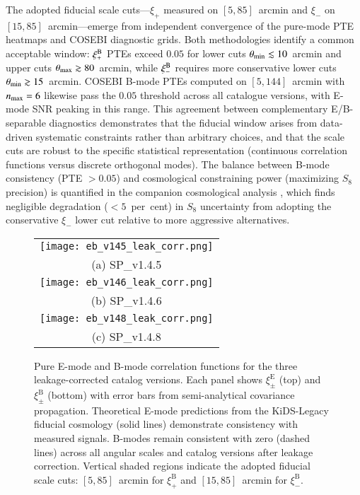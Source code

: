 \documentclass{aa}
\begin{document}
The adopted fiducial scale cuts—$\xi_+$ measured on $[5, 85]$~arcmin and $\xi_-$ on $[15, 85]$~arcmin—emerge from independent convergence of the pure-mode PTE heatmaps and COSEBI diagnostic grids. Both methodologies identify a common acceptable window: $\xi_+^{\rm B}$ PTEs exceed $0.05$ for lower cuts $\theta_{\rm min} \lesssim 10$~arcmin and upper cuts $\theta_{\rm max} \gtrsim 80$~arcmin, while $\xi_-^{\rm B}$ requires more conservative lower cuts $\theta_{\rm min} \gtrsim 15$~arcmin. COSEBI B-mode PTEs computed on $[5, 144]$~arcmin with $n_{\rm max} = 6$ likewise pass the $0.05$ threshold across all catalogue versions, with E-mode SNR peaking in this range. This agreement between complementary E/B-separable diagnostics demonstrates that the fiducial window arises from data-driven systematic constraints rather than arbitrary choices, and that the scale cuts are robust to the specific statistical representation (continuous correlation functions versus discrete orthogonal modes). The balance between B-mode consistency (PTE $> 0.05$) and cosmological constraining power (maximizing $S_8$ precision) is quantified in the companion cosmological analysis \citep{goh.etal25}, which finds negligible degradation ($< 5$~per~cent) in $S_8$ uncertainty from adopting the conservative $\xi_-$ lower cut relative to more aggressive alternatives.

\begin{figure*}[p]
\centering
\begin{tabular}{c}
\texttt{[image: eb\_v145\_leak\_corr.png]} \\
(a) SP\_v1.4.5 \\[6pt]
\texttt{[image: eb\_v146\_leak\_corr.png]} \\
(b) SP\_v1.4.6 \\[6pt]
\texttt{[image: eb\_v148\_leak\_corr.png]} \\
(c) SP\_v1.4.8
\end{tabular}
\caption{Pure E-mode and B-mode correlation functions for the three leakage-corrected catalog versions. Each panel shows $\xi_\pm^{\mathrm{E}}$ (top) and $\xi_\pm^{\mathrm{B}}$ (bottom) with error bars from semi-analytical covariance propagation. Theoretical E-mode predictions from the KiDS-Legacy fiducial cosmology (solid lines) demonstrate consistency with measured signals. B-modes remain consistent with zero (dashed lines) across all angular scales and catalog versions after leakage correction. Vertical shaded regions indicate the adopted fiducial scale cuts: $[5, 85]$~arcmin for $\xi_+^{\mathrm{B}}$ and $[15, 85]$~arcmin for $\xi_-^{\mathrm{B}}$.}
\label{fig:eb_modes}
\end{figure*}
\end{document}
